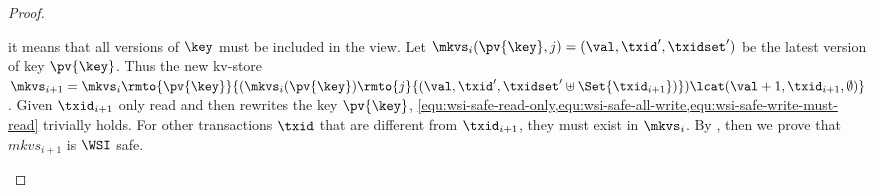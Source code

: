 \begin{proof}
\begin{itemize}
\begin{itemize}
                    it means that all versions of \( \key \) must be included in the view.
                    Let \( \mkvs_i(\pv{\key},j) = (\val, \txid', \txidset') \) be the latest version of key \( \pv{\key} \).
                    Thus the new kv-store \( \mkvs_{i+1} = \mkvs_{i}\rmto{\pv{\key}}{( \mkvs_i(\pv{\key})\rmto{j}{(\val, \txid', \txidset' \uplus \Set{\txid_{i+1}})} ) \lcat (\val+1, \txid_{i+1}, \emptyset) } \).
                    Given \( \txid_{i+1} \) only read and then rewrites the key \( \pv{\key} \), \cref{equ:wsi-safe-read-only,equ:wsi-safe-all-write,equ:wsi-safe-write-must-read} trivially holds.
                    For other transactions \( \txid \) that are different from \( \txid_{i+1} \), they must exist in \( \mkvs_i \).
                    By \ih, then we prove that \( mkvs_{i+1} \) is \( \WSI \) safe.
            \end{itemize}
    \end{itemize}
\end{proof}

